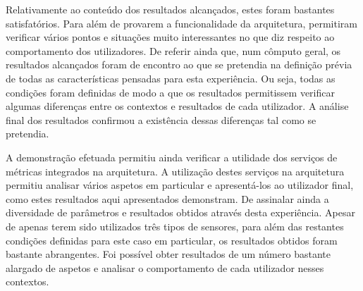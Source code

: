 Relativamente ao conteúdo dos resultados alcançados, estes foram bastantes satisfatórios. Para além de provarem a funcionalidade da arquitetura, permitiram verificar vários pontos e situações muito interessantes no que diz respeito ao comportamento dos utilizadores. De referir ainda que, num cômputo geral, os resultados alcançados foram de encontro ao que se pretendia na definição prévia de todas as características pensadas para esta experiência. Ou seja, todas as condições foram definidas de modo a que os resultados permitissem verificar algumas diferenças entre os contextos e resultados de cada utilizador. A análise final dos resultados confirmou a existência dessas diferenças tal como se pretendia.

A demonstração efetuada permitiu ainda verificar a utilidade dos serviços de métricas integrados na arquitetura. A utilização destes serviços na arquitetura permitiu analisar vários aspetos em particular e apresentá-los ao utilizador final, como estes resultados aqui apresentados demonstram. De assinalar ainda a diversidade de parâmetros e resultados obtidos através desta experiência. Apesar de apenas terem sido utilizados três tipos de sensores, para além das restantes condições definidas para este caso em particular, os resultados obtidos foram bastante abrangentes. Foi possível obter resultados de um número bastante alargado de aspetos e analisar o comportamento de cada utilizador nesses contextos.